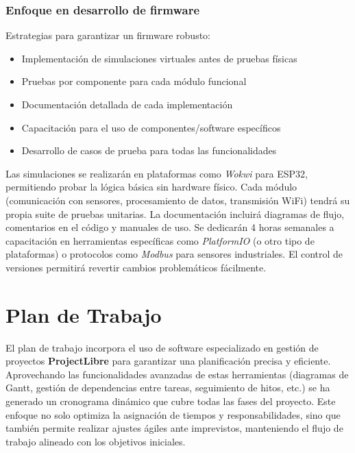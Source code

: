 \documentclass{article}
\begin{document}
\subsubsection{Enfoque en desarrollo de firmware}
Estrategias para garantizar un firmware robusto:

\begin{itemize}
    \item Implementación de simulaciones virtuales antes de pruebas físicas
    \item Pruebas por componente para cada módulo funcional
    \item Documentación detallada de cada implementación
    \item Capacitación para el uso de componentes/software específicos
    \item Desarrollo de casos de prueba para todas las funcionalidades
\end{itemize}

 Las simulaciones se realizarán en plataformas como \textit{Wokwi} para ESP32, permitiendo probar la lógica básica sin hardware físico. Cada módulo (comunicación con sensores, procesamiento de datos, transmisión WiFi) tendrá su propia suite de pruebas unitarias. La documentación incluirá diagramas de flujo, comentarios en el código y manuales de uso. Se dedicarán 4 horas semanales a capacitación en herramientas específicas como \textit{PlatformIO} (o otro tipo  de plataformas) o protocolos como \textit{Modbus} para sensores industriales. El control de versiones permitirá revertir cambios problemáticos fácilmente.

\newpage
\section{Plan de Trabajo}

El plan de trabajo incorpora el uso de software especializado en gestión de proyectos \textbf{ProjectLibre} para garantizar una planificación precisa y eficiente. Aprovechando las funcionalidades avanzadas de estas herramientas (diagramas de Gantt, gestión de dependencias entre tareas, seguimiento de hitos, etc.) se ha generado un cronograma dinámico que cubre todas las fases del proyecto. Este enfoque no solo optimiza la asignación de tiempos y responsabilidades, sino que también permite realizar ajustes ágiles ante imprevistos, manteniendo el flujo de trabajo alineado con los objetivos iniciales.
\end{document}
